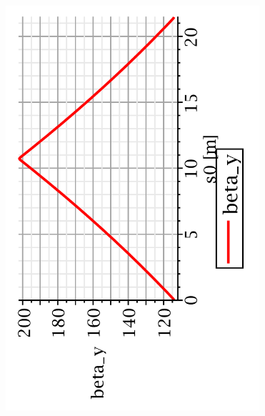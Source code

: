 \documentclass[t]{beamer}
\begin{document}
\begin{frame}{}
\begin{columns}
\begin{column}[t]{0.45\linewidth}
%
\begin{figure}[h]
\centering
\includegraphics[scale=0.24, angle=-90]{MAPLE-betay_1cell.pdf}
\end{figure}
\end{column}
%
\begin{column}[t]{0.45\linewidth}
\begin{figure}[h]
\centering

\end{figure}
\end{column}
\end{columns}
\end{frame}
\end{document}
